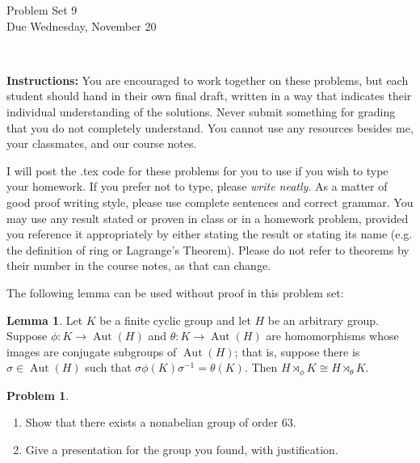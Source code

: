 \documentclass[11pt]{article}
\title{}
\date{\vspace{-0.5in}}
\DeclareMathOperator{\Aut}{Aut}
\newcommand{\sdp}{\rtimes}
\theoremstyle{definition}
\newtheorem{problem}{Problem}
\newtheorem{lemma}{Lemma}
\begin{document}
\thispagestyle{fancy}
\pagestyle{fancy}

\vspace{3em}

\begin{center}
	{\LARGE Problem Set 9\\}
	Due Wednesday, November 20
\end{center}

\

\noindent
{\bf Instructions:}
You are encouraged to work together on these problems, but each student should hand in their own final draft, written in a way that indicates their individual understanding of the solutions. Never submit something for grading that you do not completely understand. You cannot use any resources besides me, your classmates, and our course notes.


I will post the .tex code for these problems for you to use if you wish to type your homework. If you prefer not to type, please  {\em write neatly}. As a matter of good proof writing style, please use complete sentences and correct grammar. You may use any result  stated or proven in class or in a homework problem, provided you reference it appropriately by either stating the result or stating its name (e.g. the definition of ring or Lagrange's Theorem). Please do not refer to theorems by their number in the course notes, as that can change.


\vspace{2em}



\noindent
The following lemma can be used without proof in this problem set:


\begin{lemma}
Let $K$ be a finite cyclic group and let $H$ be an arbitrary group. Suppose $\phi\!: K \to \Aut(H)$ and $\theta\!: K \to \Aut(H)$ are homomorphisms whose images are conjugate subgroups of $\Aut(H)$; that is, suppose there is $\sigma \in \Aut(H)$ such that $\sigma \phi(K) \sigma^{-1} = \theta(K)$. Then $H \sdp_\phi K \cong H \sdp_\theta K$. 
\end{lemma}



\begin{problem}$\,$
\begin{enumerate}[label=(1.\arabic*), itemsep=0.1em]
\item Show that there exists a nonabelian group of order $63$.

\item Give a presentation for the group you found, with justification.	
\end{enumerate}
\end{problem}
\end{document}
